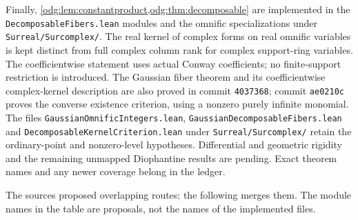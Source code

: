 \documentclass[11pt,oneside]{article}
\numberwithin{equation}{section}
\theoremstyle{definition}
\theoremstyle{remark}
\newcommand{\fn}[1]{\nolinkurl{#1}}
\begin{document}
Finally, \cref{odg:lem:constantproduct,odg:thm:decomposable} are implemented
in the \fn{DecomposableFibers.lean} modules and the omnific specializations
under \fn{Surreal/Surcomplex/}. The real kernel of complex forms on real
omnific variables is kept distinct from full complex column rank for
complex support-ring variables. The coefficientwise statement uses actual
Conway coefficients; no finite-support restriction is introduced. The
Gaussian fiber theorem and its coefficientwise complex-kernel description
are also proved in commit \texttt{4037368}; commit \texttt{ae0210c} proves
the converse existence criterion, using a nonzero purely infinite monomial.
The files \fn{GaussianOmnificIntegers.lean},
\fn{GaussianDecomposableFibers.lean} and
\fn{DecomposableKernelCriterion.lean} under \fn{Surreal/Surcomplex/}
retain the ordinary-point and nonzero-level hypotheses. Differential and
geometric rigidity and the remaining unmapped Diophantine results are
pending. Exact theorem names and any newer coverage belong in the ledger.

The sources proposed overlapping routes; the following merges them. The
module names in the table are proposals, not the names of the implemented files.
\end{document}
